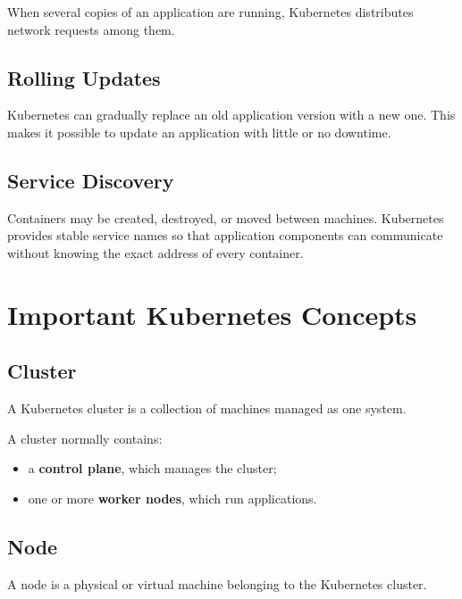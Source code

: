 \documentclass[a4paper]{article}
\begin{document}
            When several copies of an application are running, Kubernetes distributes
            network requests among them.
        
        \subsection{Rolling Updates}
            
            Kubernetes can gradually replace an old application version with a new one.
            This makes it possible to update an application with little or no downtime.
        
        \subsection{Service Discovery}
            
            Containers may be created, destroyed, or moved between machines. Kubernetes
            provides stable service names so that application components can communicate
            without knowing the exact address of every container.
    
    
    \section{Important Kubernetes Concepts}
        
        \subsection{Cluster}
            
            A Kubernetes cluster is a collection of machines managed as one system.
            
            A cluster normally contains:
            
            \begin{itemize}
                \item a \textbf{control plane}, which manages the cluster;
                \item one or more \textbf{worker nodes}, which run applications.
            \end{itemize}
        
        \subsection{Node}
            
            A node is a physical or virtual machine belonging to the Kubernetes cluster.
        
\end{document}
